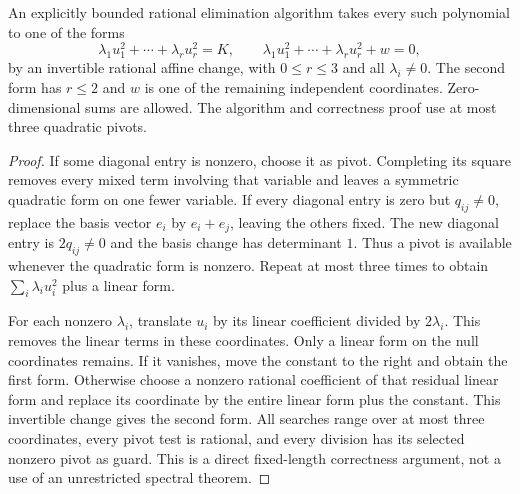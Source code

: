 \begin{theorem}\label{con:quadric-reduction}
An explicitly bounded rational elimination algorithm takes every such
polynomial to one of the forms
\[
 \lambda_1u_1^2+\cdots+\lambda_ru_r^2=K,
 \qquad
 \lambda_1u_1^2+\cdots+\lambda_ru_r^2+w=0,
\]
by an invertible rational affine change, with $0\le r\le3$ and all
$\lambda_i\ne0$. The second form has $r\le2$ and $w$ is one of the
remaining independent coordinates. Zero-dimensional sums are allowed.
The algorithm and correctness proof use at most three quadratic pivots.
\end{theorem}
\begin{proof}
If some diagonal entry is nonzero, choose it as pivot. Completing its
square removes every mixed term involving that variable and leaves
a symmetric quadratic form on one fewer variable. If every diagonal
entry is zero but $q_{ij}\ne0$, replace the basis vector $e_i$ by
$e_i+e_j$, leaving the others fixed. The new diagonal entry is
$2q_{ij}\ne0$ and the basis change has determinant $1$. Thus a pivot
is available whenever the quadratic form is nonzero. Repeat at most
three times to obtain $\sum_i\lambda_i u_i^2$ plus a linear form.

For each nonzero $\lambda_i$, translate $u_i$ by its linear coefficient
divided by $2\lambda_i$. This removes the linear terms in these
coordinates. Only a linear form on the null coordinates remains.
If it vanishes, move the constant to the right and obtain the first
form. Otherwise choose a nonzero rational coefficient of that residual
linear form and replace its coordinate by the entire linear form plus
the constant. This invertible change gives the second form. All searches
range over at most three coordinates, every pivot test is rational,
and every division has its selected nonzero pivot as guard. This is
a direct fixed-length correctness argument, not a use of an unrestricted
spectral theorem.
\end{proof}

